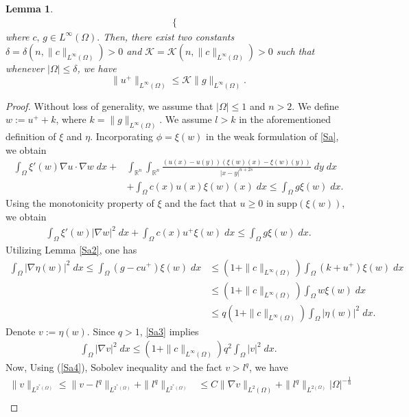 \documentclass[11pt, notitlepage]{article}
\def\R{\mathbb{R}}
\newtheorem{Lemma}[Theorem]{Lemma}
\begin{document}
{\begin{Lemma}
\begin{align}
\begin{cases}
    \end{cases}
\end{align}
where $c,\, g\in L^\infty(\Omega).$ Then, there exist two constants $\delta=\delta(n,\|c\|_{L^\infty(\Omega)})>0$ and $\mathcal{K}=\mathcal{K}(n,\|c\|_{L^\infty(\Omega)})>0$
such that whenever $|\Omega|\leq\delta$, we have $$\|u^+\|_{L^\infty(\Omega)}\leq \mathcal{K} \|g\|_{L^\infty(\Omega)}.$$    
\end{Lemma}
\begin{proof}
Without loss of generality, we assume that $|\Omega|\leq 1$ and $n>2$. We define $w:=u^++k$, where $k=\|g\|_{L^\infty(\Omega)}$. We assume $l>k$ in the aforementioned definition of $\xi$ and $\eta$. Incorporating $\phi=\xi(w)$ in the weak formulation of \eqref{Sa}, we obtain 
\begin{align*}
    \int_\Omega \xi'(w)\nabla u\cdot\nabla w\;dx+&\int_{\R^n}\int_{\R^n}\frac{(u(x)-u(y))(\xi(w)(x)-\xi(w)(y))}{|x-y|^{n+2s}}\;dy\;dx\nonumber\\
    &+\int_{\Omega}c(x)u(x)\xi(w)(x)\;dx\leq\int_{\Omega}g\xi(w)\;dx.
\end{align*}
Using the monotonicity property of $\xi$ and the fact that $ u\geq 0$ in $\mathrm{supp}(\xi(w))$, we obtain
\begin{align*}
    \int_\Omega \xi'(w)|\nabla w|^2\;dx+\int_{\Omega}c(x)u^+\xi(w)\;dx\leq\int_{\Omega}g\xi(w)\;dx.
\end{align*}
Utilizing Lemma \ref{Sa2}, one has
\begin{align}\label{Sa3}
     \int_\Omega |\nabla\eta(w)|^2\;dx\leq\int_{\Omega}(g-cu^+)\xi(w)\;dx&\leq (1+\|c\|_{L^\infty(\Omega)})\int_{\Omega}(k+u^+)\xi(w)\;dx \nonumber\\
     &\leq (1+\|c\|_{L^\infty(\Omega)})\int_\Omega w\xi(w)\;dx\nonumber\\
     &\leq q(1+\|c\|_{L^\infty(\Omega)})\int_\Omega |\eta(w)|^2\;dx.
\end{align}
Denote $v:=\eta(w)$. Since $q>1$, \eqref{Sa3} implies
\begin{align}\label{Sa4}
    \int_\Omega |\nabla v|^2\;dx\leq (1+\|c\|_{L^\infty(\Omega)})q^2\int_\Omega |v|^2\;dx.
\end{align}
Now, Using (\ref{Sa4}), Sobolev inequality and the fact $v>l^q$, we have
\begin{align*}
    \|v\|_{L^{2^*(\Omega)}}\leq \|v-l^q\|_{L^{2^*(\Omega)}}+\|l^q\|_{L^{2^*(\Omega)}}&\leq C\|\nabla v\|_{L^2(\Omega)}+\|l^q\|_{L^{2(\Omega)}}|\Omega|^{-\frac{1}{n}}\nonumber\\

\end{align*}
\end{proof}}
\end{document}
